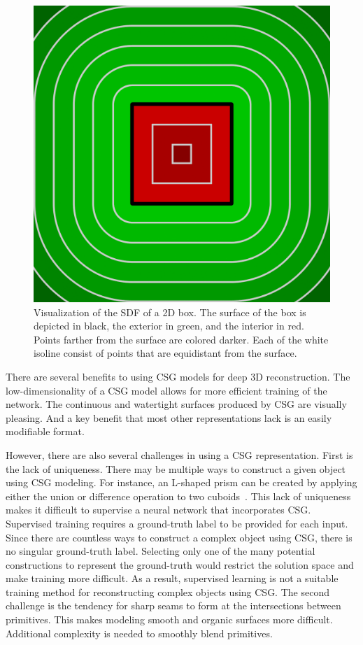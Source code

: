 \begin{figure}
	\centering
	\includegraphics[scale=0.2]{Images/SDF Box}
	\caption{Visualization of the SDF of a 2D box. The surface of the box is depicted in black, the exterior in green, and the interior in red. Points farther from the surface are colored darker. Each of the white isoline consist of points that are equidistant from the surface.}
	\label{fig:sdf_box}
\end{figure}

There are several benefits to using CSG models for deep 3D reconstruction. The low-dimensionality of a CSG model allows for more efficient training of the network. The continuous and watertight surfaces produced by CSG are visually pleasing. And a key benefit that most other representations lack is an easily modifiable format.

However, there are also several challenges in using a CSG representation. First is the lack of uniqueness. There may be multiple ways to construct a given object using CSG modeling. For instance, an L-shaped prism can be created by applying either the union or difference operation to two cuboids~\cite{Hughes2013}. This lack of uniqueness makes it difficult to supervise a neural network that incorporates CSG. Supervised training requires a ground-truth label to be provided for each input. Since there are countless ways to construct a complex object using CSG, there is no singular ground-truth label. Selecting only one of the many potential constructions to represent the ground-truth would restrict the solution space and make training more difficult. As a result, supervised learning is not a suitable training method for reconstructing complex objects using CSG. The second challenge is the tendency for sharp seams to form at the intersections between primitives. This makes modeling smooth and organic surfaces more difficult. Additional complexity is needed to smoothly blend primitives.

